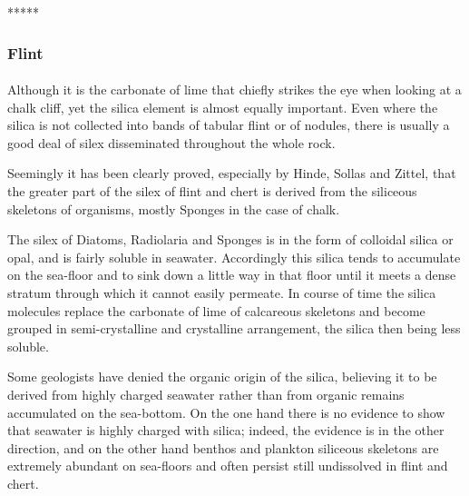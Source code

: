 \documentclass[a4paper, 12pt, oneside, landscape]{article}
\begin{document}
\centerline{*\hspace{15mm}*\hspace{15mm}*\hspace{15mm}*\hspace{15mm}*}
\bigskip

\subsubsection{Flint}
\paragraph{}
Although it is the carbonate of lime that chiefly strikes the eye when looking at a chalk cliff, yet the silica element is almost equally important. Even where the silica is not collected into bands of tabular flint or of nodules, there is usually a good deal of silex disseminated throughout the whole rock.

Seemingly it has been clearly proved, especially by Hinde, Sollas and Zittel, that the greater part of the silex of flint and chert is derived from the siliceous skeletons of organisms, mostly Sponges in the case of chalk.

The silex of Diatoms, Radiolaria and Sponges is in the form of colloidal silica or opal, and is fairly soluble in seawater. Accordingly this silica tends to accumulate on the sea-floor and to sink down a little way in that floor until it meets a dense stratum through which it cannot easily permeate. In course of time the silica molecules replace the carbonate of lime of calcareous skeletons and become grouped in semi-crystalline and crystalline arrangement, the silica then being less soluble.

Some geologists have denied the organic origin of the silica, believing it to be derived from highly charged seawater rather than from organic remains accumulated on the sea-bottom. On the one hand there is no evidence to show that seawater is highly charged with silica; indeed, the evidence is in the other direction, and on the other hand benthos and plankton siliceous skeletons are extremely abundant on sea-floors and often persist still undissolved in flint and chert.
\end{document}
